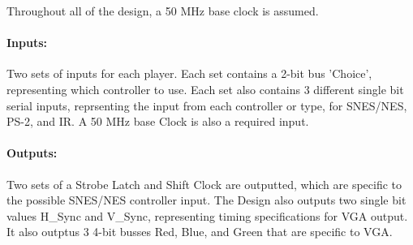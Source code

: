 \documentclass[]{article}
\begin{document}
Throughout all of the design, a 50 MHz base clock is assumed.
\paragraph{Inputs:} Two sets of inputs for each player. Each set contains a 2-bit bus 'Choice', 
representing which controller to use. Each set also contains 3 different single bit serial inputs,
reprsenting the input from each controller or type, for SNES/NES, PS-2, and IR. A 50 MHz base Clock is also a required input.
\paragraph{Outputs:} Two sets of a Strobe Latch and Shift Clock are outputted, which are specific
 to the possible SNES/NES controller input. The Design also outputs two single bit values H\_Sync and V\_Sync, representing timing specifications for VGA output.
 It also outptus 3 4-bit busses Red, Blue, and Green that are specific to VGA.
\end{document}

